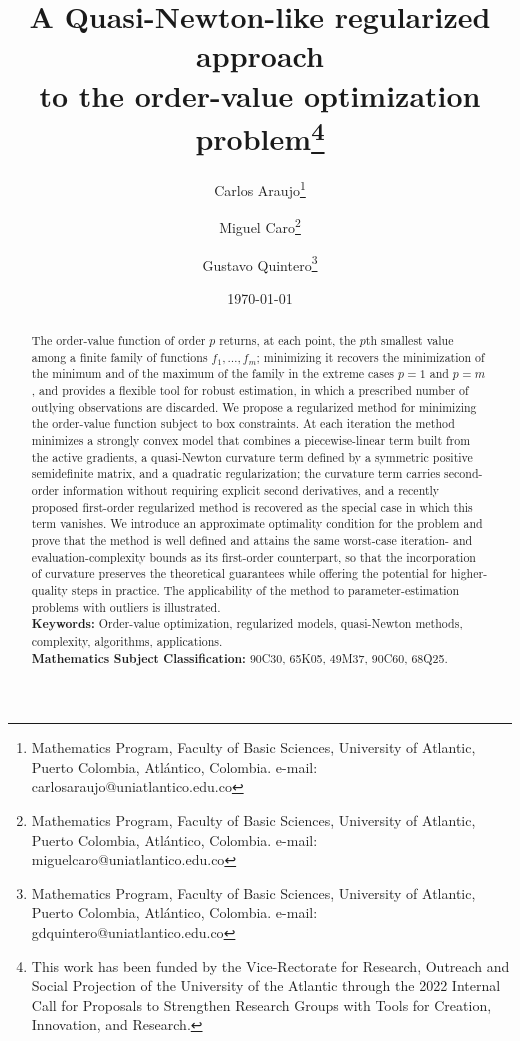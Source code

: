 \documentclass[11pt]{article}
\begin{document}
\title{A Quasi-Newton-like regularized approach\\ to the order-value optimization problem\thanks{This work has been funded by the Vice-Rectorate for Research, Outreach and Social Projection of the University of the Atlantic through the 2022 Internal Call for Proposals to Strengthen Research Groups with Tools for Creation, Innovation, and Research.}}

\author{
    Carlos Araujo\thanks{Mathematics Program, Faculty of Basic Sciences, University of Atlantic, Puerto Colombia, Atlántico, Colombia. e-mail: carlosaraujo@uniatlantico.edu.co}
    \and
    Miguel Caro\thanks{Mathematics Program, Faculty of Basic Sciences, University of Atlantic, Puerto Colombia, Atlántico, Colombia. e-mail: miguelcaro@uniatlantico.edu.co}
    \and
    Gustavo Quintero\thanks{Mathematics Program, Faculty of Basic Sciences, University of Atlantic, Puerto Colombia, Atlántico, Colombia. e-mail: gdquintero@uniatlantico.edu.co}
}

\date{\today}
\maketitle

\begin{abstract}
The order-value function of order $p$ returns, at each point, the $p$th
smallest value among a finite family of functions $f_1,\dots,f_m$;
minimizing it recovers the minimization of the minimum and of the maximum
of the family in the extreme cases $p=1$ and $p=m$, and provides a flexible
tool for robust estimation, in which a prescribed number of outlying
observations are discarded. We propose a regularized method for minimizing
the order-value function subject to box constraints. At each iteration the
method minimizes a strongly convex model that combines a piecewise-linear
term built from the active gradients, a quasi-Newton curvature term defined
by a symmetric positive semidefinite matrix, and a quadratic regularization;
the curvature term carries second-order information without requiring explicit
second derivatives, and a recently proposed first-order regularized method is
recovered as the special case in which this term vanishes. We introduce an
approximate optimality condition for the problem and prove that the method is
well defined and attains the same worst-case iteration- and
evaluation-complexity bounds as its first-order counterpart, so that the
incorporation of curvature preserves the theoretical guarantees while offering
the potential for higher-quality steps in practice. The applicability of the
method to parameter-estimation problems with outliers is illustrated.\\

\noindent
\textbf{Keywords:} Order-value optimization, regularized models,
quasi-Newton methods, complexity, algorithms, applications.\\

\noindent
\textbf{Mathematics Subject Classification:} 90C30, 65K05, 49M37, 90C60, 68Q25.\\
\end{abstract}
\end{document}
